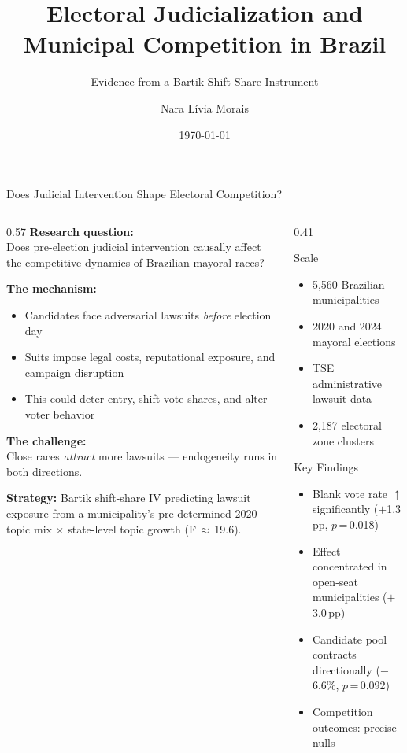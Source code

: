 \documentclass[aspectratio=169,10pt]{beamer}
\title{Electoral Judicialization and\\Municipal Competition in Brazil}
\subtitle{Evidence from a Bartik Shift-Share Instrument}
\author{Nara Lívia Morais}
\institute{FEA--USP}
\date{\today}
\begin{document}

\maketitle


\begin{frame}{Does Judicial Intervention Shape Electoral Competition?}
\begin{columns}[T]
\begin{column}{0.57\textwidth}
\textbf{Research question:}\\
Does pre-election judicial intervention causally affect the competitive dynamics of Brazilian mayoral races?
\medskip

\textbf{The mechanism:}
\begin{itemize}
  \item Candidates face adversarial lawsuits \emph{before} election day
  \item Suits impose legal costs, reputational exposure, and campaign disruption
  \item This could deter entry, shift vote shares, and alter voter behavior
\end{itemize}
\medskip

\textbf{The challenge:}\\
Close races \emph{attract} more lawsuits --- endogeneity runs in both directions.
\smallskip

\textbf{Strategy:} Bartik shift-share IV predicting lawsuit exposure from a municipality's pre-determined 2020 topic mix $\times$ state-level topic growth (F\,$\approx$\,19.6).
\end{column}
\begin{column}{0.41\textwidth}
\begin{block}{Scale}
  \begin{itemize}
    \item 5,560 Brazilian municipalities
    \item 2020 and 2024 mayoral elections
    \item TSE administrative lawsuit data
    \item 2,187 electoral zone clusters
  \end{itemize}
\end{block}
\medskip
\begin{alertblock}{Key Findings}
  \footnotesize
  \begin{itemize}
    \item Blank vote rate $\uparrow$ significantly ($+$1.3\,pp, $p$\,=\,0.018)
    \item Effect concentrated in open-seat municipalities ($+$3.0\,pp)
    \item Candidate pool contracts directionally ($-$6.6\%, $p$\,=\,0.092)
    \item Competition outcomes: precise nulls
  \end{itemize}
\end{alertblock}
\end{column}
\end{columns}
\end{frame}
\end{document}
